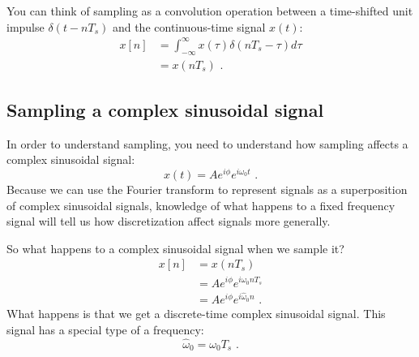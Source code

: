  You can think of sampling as a convolution operation between a
time-shifted unit impulse $\delta(t-nT_s)$ and the continuous-time
signal $x(t)$:
\begin{align}
  x[n] & = \int_{-\infty}^{\infty} x(\tau) \delta(n T_s - \tau)  d\tau \\
       & = x(n T_s)\,\,.
\end{align}
\fi

\subsection{Sampling a complex sinusoidal signal}
In order to understand sampling, you need to understand how sampling affects a complex sinusoidal signal:
\begin{equation}
    x(t)=A e^{i\phi} e^{i\omega_0 t}\,\,.
\end{equation}
Because we can use the Fourier transform to represent signals as a superposition of complex sinusoidal signals, knowledge of what happens to a fixed frequency signal will tell us how discretization affect signals more generally.

\begin{marginfigure}
\begin{center}
\end{center}
\end{marginfigure}

So what happens to a complex sinusoidal signal when we sample it? 
\begin{align}
x[n]&=x(nT_s)\\
    &=A e^{i\phi} e^{i\omega_0 n T_s }\\
    &=A e^{i\phi} e^{i\hat{\omega}_0 n}\,\,.
\end{align}
What happens is that we get a discrete-time complex sinusoidal signal. This signal has a special type of a frequency:
\begin{equation}
  \boxed{
    \hat{\omega}_0 = \omega_0 T_s
    }\,\,.
\end{equation}

